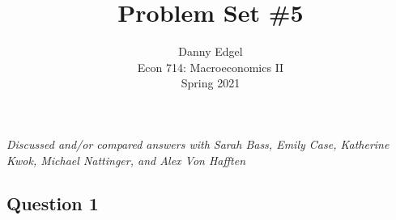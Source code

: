 \documentclass{article}
\begin{document}
\title{	Problem Set \#5 }
\author{ 	Danny Edgel 					\\ 
			Econ 714: Macroeconomics II		\\
			Spring 2021						\\
		}
\maketitle\thispagestyle{empty}


\noindent\textit{Discussed and/or compared answers with Sarah Bass, Emily Case, Katherine Kwok, Michael Nattinger, and Alex Von Hafften}


\subsection*{Question 1}
\end{document}
